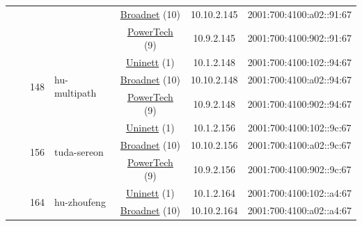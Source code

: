 \begin{small}
\begin{center}
\begin{longtable}{|c|c|c|c|c|c|c|c|}
  &  &  &  & \multicolumn{2}{|c|}{\tiny{\href{https://www.broadnet.no}{Broadnet} (10)}} & \tiny{10.10.2.145} & \tiny{2001:700:4100:a02::91:67} \\* \cline{5-5}\cline{6-6}\cline{7-7}\cline{8-8}
  &  &  &  & \multicolumn{2}{|c|}{\tiny{\href{http://www.powertech.no}{PowerTech} (9)}} & \tiny{10.9.2.145} & \tiny{2001:700:4100:902::91:67} \\* \cline{3-3}\cline{4-4}\cline{5-5}\cline{6-6}\cline{7-7}\cline{8-8}
  &  & \multirow{3}{*}{\tiny{148}} & \multicolumn{1}{|l|}{\multirow{3}{*}{\tiny{hu-multipath}}} & \multicolumn{2}{|c|}{\tiny{\href{https://www.uninett.no}{Uninett} (1)}} & \tiny{10.1.2.148} & \tiny{2001:700:4100:102::94:67} \\* \cline{5-5}\cline{6-6}\cline{7-7}\cline{8-8}
  &  &  &  & \multicolumn{2}{|c|}{\tiny{\href{https://www.broadnet.no}{Broadnet} (10)}} & \tiny{10.10.2.148} & \tiny{2001:700:4100:a02::94:67} \\* \cline{5-5}\cline{6-6}\cline{7-7}\cline{8-8}
  &  &  &  & \multicolumn{2}{|c|}{\tiny{\href{http://www.powertech.no}{PowerTech} (9)}} & \tiny{10.9.2.148} & \tiny{2001:700:4100:902::94:67} \\* \cline{3-3}\cline{4-4}\cline{5-5}\cline{6-6}\cline{7-7}\cline{8-8}
  &  & \multirow{3}{*}{\tiny{156}} & \multicolumn{1}{|l|}{\multirow{3}{*}{\tiny{tuda-sereon}}} & \multicolumn{2}{|c|}{\tiny{\href{https://www.uninett.no}{Uninett} (1)}} & \tiny{10.1.2.156} & \tiny{2001:700:4100:102::9c:67} \\* \cline{5-5}\cline{6-6}\cline{7-7}\cline{8-8}
  &  &  &  & \multicolumn{2}{|c|}{\tiny{\href{https://www.broadnet.no}{Broadnet} (10)}} & \tiny{10.10.2.156} & \tiny{2001:700:4100:a02::9c:67} \\* \cline{5-5}\cline{6-6}\cline{7-7}\cline{8-8}
  &  &  &  & \multicolumn{2}{|c|}{\tiny{\href{http://www.powertech.no}{PowerTech} (9)}} & \tiny{10.9.2.156} & \tiny{2001:700:4100:902::9c:67} \\* \cline{3-3}\cline{4-4}\cline{5-5}\cline{6-6}\cline{7-7}\cline{8-8}
  &  & \multirow{3}{*}{\tiny{164}} & \multicolumn{1}{|l|}{\multirow{3}{*}{\tiny{hu-zhoufeng}}} & \multicolumn{2}{|c|}{\tiny{\href{https://www.uninett.no}{Uninett} (1)}} & \tiny{10.1.2.164} & \tiny{2001:700:4100:102::a4:67} \\* \cline{5-5}\cline{6-6}\cline{7-7}\cline{8-8}
  &  &  &  & \multicolumn{2}{|c|}{\tiny{\href{https://www.broadnet.no}{Broadnet} (10)}} & \tiny{10.10.2.164} & \tiny{2001:700:4100:a02::a4:67} \\* \cline{5-5}\cline{6-6}\cline{7-7}\cline{8-8}

\end{longtable}
\end{center}
\end{small}
